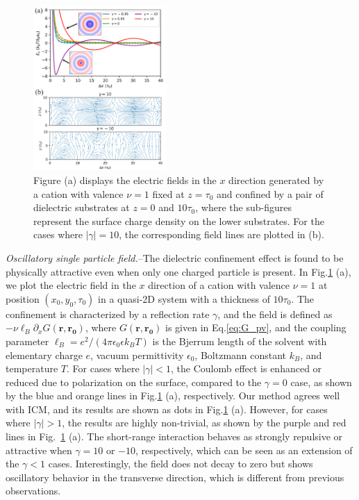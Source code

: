 \documentclass[aps,prl,reprint,showpacs,floatfix,superscriptaddress]{revtex4-2}
\newcommand{\V}[1]{\boldsymbol{#1}} %
\newcommand{\abs}[1]{\left|#1\right|} %
\newcommand{\eps}{\epsilon}
\begin{document}
\begin{figure}[htbp]
	\centering
	\includegraphics[width=0.45\textwidth]{figs/fig2.pdf}
	\caption{
        Figure (a) displays the electric fields in the $x$ direction generated by a cation with valence $\nu=1$ fixed at $z=\tau_0$ and confined by a pair of dielectric substrates at $z=0$ and $10\tau_0$, where the sub-figures represent the surface charge density on the lower substrates. 
        For the cases where $|\gamma|=10$, the corresponding field lines are plotted in (b).
		\label{fig:force_x}
            }
\end{figure}

\textit{Oscillatory single particle field.}--The dielectric confinement effect is found to be physically attractive even when only one charged particle is present. 
In Fig.\ref{fig:force_x} (a), we plot the electric field in the $x$ direction of a cation with valence $\nu = 1$ at position $(x_0, y_0, \tau_0)$ in a quasi-2D system with a thickness of $10 \tau_0$. 
The confinement is characterized by a reflection rate $\gamma$, and the field is defined as $ - \nu \ell_B \partial_x G(\V r, \V{r_0})$, where $G(\V r, \V{r_0})$ is given in Eq.\eqref{eq:G_pv}, and the coupling parameter $\ell_B = e^2 / (4 \pi \eps_0 \eps k_B T)$ is the Bjerrum length of the solvent with elementary charge $e$, vacuum permittivity $\eps_0$, Boltzmann constant $k_B$, and temperature $T$.
For cases where $\abs{\gamma} < 1$, the Coulomb effect is enhanced or reduced due to polarization on the surface, compared to the $\gamma = 0$ case, as shown by the blue and orange lines in Fig.\ref{fig:force_x} (a), respectively. 
Our method agrees well with ICM, and its results are shown as dots in Fig.\ref{fig:force_x} (a).
However, for cases where $\abs{\gamma} > 1$, the results are highly non-trivial, as shown by the purple and red lines in Fig.~\ref{fig:force_x} (a). 
The short-range interaction behaves as strongly repulsive or attractive when $\gamma = 10$ or $-10$, respectively, which can be seen as an extension of the $\gamma < 1$ cases. Interestingly, the field does not decay to zero but shows oscillatory behavior in the transverse direction, which is different from previous observations.
\end{document}
